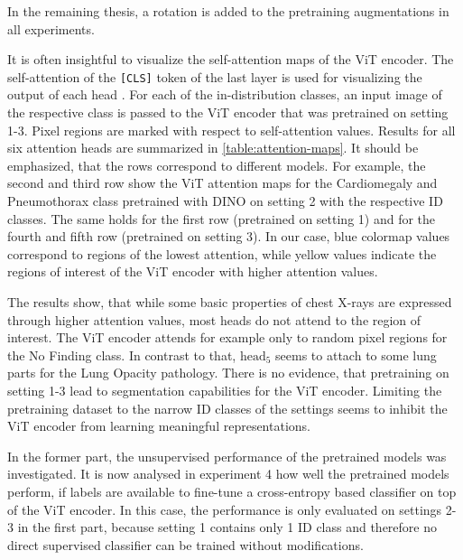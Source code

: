 In the remaining thesis, a rotation is added to the pretraining augmentations in all experiments.
\par
It is often insightful to visualize the self-attention maps of the ViT encoder.
The self-attention of the \texttt{[CLS]} token of the last layer is used for visualizing the output of each head \citep{Caron2021,Dosovitskiy2020}.
For each of the in-distribution classes, an input image of the respective class is passed to the ViT encoder that was pretrained on setting 1-3.
Pixel regions are marked with respect to self-attention values.
Results for all six attention heads are summarized in \ref{table:attention-maps}.
It should be emphasized, that the rows correspond to different models.
For example, the second and third row show the ViT attention maps for the Cardiomegaly and Pneumothorax class pretrained with DINO on setting 2 with the respective ID classes.
The same holds for the first row (pretrained on setting 1) and for the fourth and fifth row (pretrained on setting 3).
In our case, blue colormap values correspond to regions of the lowest attention, while yellow values indicate the regions of interest of the ViT encoder with higher attention values.
\par
The results show, that while some basic properties of chest X-rays are expressed through higher attention values, most heads do not attend to the region of interest.
The ViT encoder attends for example only to random pixel regions for the No Finding class.
In contrast to that, $\text{head}_5$ seems to attach to some lung parts for the Lung Opacity pathology.
There is no evidence, that pretraining on setting 1-3 lead to segmentation capabilities for the ViT encoder.
Limiting the pretraining dataset to the narrow ID classes of the settings seems to inhibit the ViT encoder from learning meaningful representations.
\par
In the former part, the unsupervised performance of the pretrained models was investigated.
It is now analysed in experiment 4 how well the pretrained models perform, if labels are available to fine-tune a cross-entropy based classifier on top of the ViT encoder.
In this case, the performance is only evaluated on settings 2-3 in the first part, because setting 1 contains only 1 ID class and therefore no direct supervised classifier can be trained without modifications.
